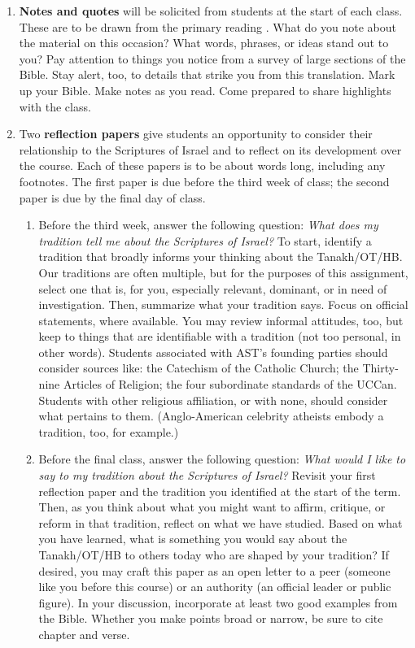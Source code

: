 \documentclass[titlepage]{article}
\begin{document}
\begin{enumerate}

	\item \textbf{Notes and quotes} will be solicited from students at
	the start of each class. These are to be drawn from the primary
	reading \cite{njps}. What do you note about the material on this
	occasion? What words, phrases, or ideas stand out to you? Pay
	attention to things you notice from a survey of large sections of
	the Bible. Stay alert, too, to details that strike you from this
	translation. Mark up your Bible. Make notes as you read. Come
	prepared to share highlights with the class.

	\item Two \textbf{reflection papers} give students an opportunity to
	consider their relationship to the Scriptures of Israel and to
	reflect on its development over the course. Each of these papers is
	to be about  words long, including any footnotes.
	The first paper is due before the third week of class; the second
	paper is due by the final day of class.

	\begin{enumerate}

		\item Before the third week, answer the following question:
		\emph{What does my tradition tell me about the Scriptures of
		Israel?} To start, identify a tradition that broadly informs
		your thinking about the Tanakh/OT/HB. Our traditions are often
		multiple, but for the purposes of this assignment, select one
		that is, for you, especially relevant, dominant, or in need of
		investigation. Then, summarize what your tradition says. Focus
		on official statements, where available. You may review informal
		attitudes, too, but keep to things that are identifiable with a
		tradition (not too personal, in other words). Students
		associated with AST's founding parties should consider sources
		like: the Catechism of the Catholic Church; the Thirty-nine
		Articles of Religion; the four subordinate standards of the
		UCCan. Students with other religious affiliation, or with none,
		should consider what pertains to them. (Anglo-American celebrity
		atheists embody a tradition, too, for example.)

		\item Before the final class, answer the following question:
		\emph{What would I like to say to my tradition about the
		Scriptures of Israel?} Revisit your first reflection paper and
		the tradition you identified at the start of the term. Then, as
		you think about what you might want to affirm, critique, or
		reform in that tradition, reflect on what we have studied. Based
		on what you have learned, what is something you would say about
		the Tanakh/OT/HB to others today who are shaped by your
		tradition? If desired, you may craft this paper as an open
		letter to a peer (someone like you before this course) or an
		authority (an official leader or public figure). In your
		discussion, incorporate at least two good examples from the
		Bible. Whether you make points broad or narrow, be sure to cite
		chapter and verse.


\end{enumerate}
\end{enumerate}
\end{document}
